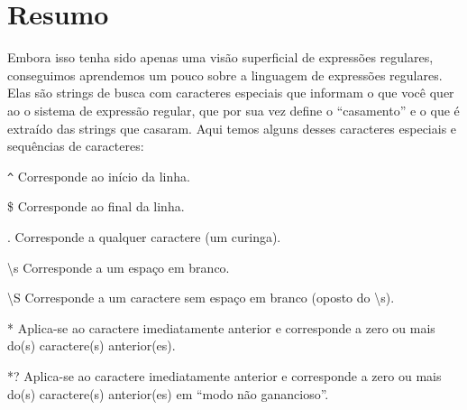 \section{Resumo}

Embora isso tenha sido apenas uma visão superficial de expressões regulares, conseguimos 
aprendemos um pouco sobre a linguagem de expressões regulares. Elas são strings de busca com 
caracteres especiais que informam o que você quer ao o sistema de expressão regular, que por 
sua vez define o ``casamento'' e o que é extraído das strings que casaram. Aqui temos alguns 
desses caracteres especiais e sequências de caracteres:

\verb"^" \newline
Corresponde ao início da linha.

\$ \newline
Corresponde ao final da linha.

. \newline
Corresponde a qualquer caractere (um curinga).

{\textbackslash}s \newline
Corresponde a um espaço em branco.

{\textbackslash}S \newline
Corresponde a um caractere sem espaço em branco (oposto do {\textbackslash}s).

* \newline
Aplica-se ao caractere imediatamente anterior e corresponde a zero ou mais do(s) caractere(s)
anterior(es).

*? \newline
Aplica-se ao caractere imediatamente anterior e corresponde a zero ou mais do(s) caractere(s) 
anterior(es) em ``modo não ganancioso''.

